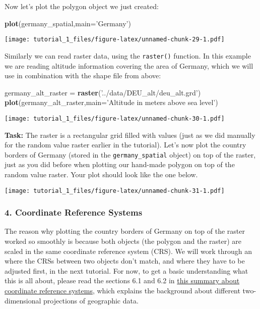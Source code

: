 \documentclass[]{article}
\newenvironment{Shaded}{\begin{snugshade}}{\end{snugshade}}
\newcommand{\DataTypeTok}[1]{\textcolor[rgb]{0.13,0.29,0.53}{#1}}
\newcommand{\KeywordTok}[1]{\textcolor[rgb]{0.13,0.29,0.53}{\textbf{#1}}}
\newcommand{\NormalTok}[1]{#1}
\newcommand{\StringTok}[1]{\textcolor[rgb]{0.31,0.60,0.02}{#1}}
\begin{document}
Now let's plot the polygon object we just created:

\begin{Shaded}
\begin{Highlighting}[]
\KeywordTok{plot}\NormalTok{(germany_spatial,}\DataTypeTok{main=}\StringTok{'Germany'}\NormalTok{)}
\end{Highlighting}
\end{Shaded}

\texttt{[image: tutorial\_1\_files/figure-latex/unnamed-chunk-29-1.pdf]}

Similarly we can read raster data, using the \texttt{raster()} function.
In this example we are reading altitude information covering the area of
Germany, which we will use in combination with the shape file from
above:

\begin{Shaded}
\begin{Highlighting}[]
\NormalTok{germany_alt_raster =}\StringTok{ }\KeywordTok{raster}\NormalTok{(}\StringTok{'../data/DEU_alt/deu_alt.grd'}\NormalTok{)}
\KeywordTok{plot}\NormalTok{(germany_alt_raster,}\DataTypeTok{main=}\StringTok{'Altitude in meters above sea level'}\NormalTok{)}
\end{Highlighting}
\end{Shaded}

\texttt{[image: tutorial\_1\_files/figure-latex/unnamed-chunk-30-1.pdf]}

\textbf{Task:} The raster is a rectangular grid filled with values (just
as we did manually for the random value raster earlier in the tutorial).
Let's now plot the country borders of Germany (stored in the
\texttt{germany\_spatial} object) on top of the raster, just as you did
before when plotting our hand-made polygon on top of the random value
raster. Your plot should look like the one below.

\texttt{[image: tutorial\_1\_files/figure-latex/unnamed-chunk-31-1.pdf]}

\hypertarget{coordinate-reference-systems}{%
\subsubsection{4. Coordinate Reference
Systems}\label{coordinate-reference-systems}}

The reason why plotting the country borders of Germany on top of the
raster worked so smoothly is because both objects (the polygon and the
raster) are scaled in the same coordinate reference system (CRS). We
will work through an where the CRSs between two objects don't match, and
where they have to be adjusted first, in the next tutorial. For now, to
get a basic understanding what this is all about, please read the
sections 6.1 and 6.2 in
\href{http://rspatial.org/spatial/rst/6-crs.html}{this summary about
coordinate reference systems}, which explains the background about
different two-dimensional projections of geographic data.
\end{document}
